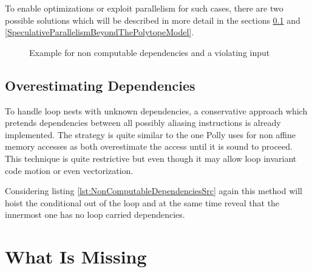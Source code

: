 To enable optimizations or exploit parallelism for such cases, 
there are two possible solutions which will be described in more detail 
in the sections \ref{OverestimatingDependencies} and 
\ref{SpeculativeParallelismBeyondThePolytopeModel}.

\lstset{frame=none}
\begin{figure}[htbp]
  \centering
  

  \label{fig:NonComputableDependencies} 
  \caption{Example for non computable dependencies and a violating input}
\end{figure}
\resetlst





\subsection{Overestimating Dependencies}
\label{OverestimatingDependencies}
To handle loop nests with unknown dependencies, a conservative approach which 
pretends dependencies between all possibly aliasing instructions is already 
implemented.
The strategy is quite similar to the one Polly uses for non 
affine memory accesses as both overestimate the access until it is sound to 
proceed. This technique is quite restrictive but even though it may allow
loop invariant code motion or even vectorization. 

Considering listing \ref{lst:NonComputableDependenciesSrc} again this method 
will hoist the conditional out of the loop and at the same time reveal that
the innermost one has no loop carried dependencies. 





\section{What Is Missing}





